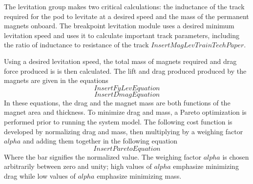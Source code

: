 The levitation group makes two critical calculations: the inductance of the track required for the pod to levitate at a desired speed and the mass of the permanent magnets onboard. The breakpoint levitation module uses a desired minimum levitation speed and uses it to calculate important track parameters, including the ratio of inductance to resistance of the track $Insert MagLevTrain Tech Paper$. 

Using a desired levitation speed, the total mass of magnets required and drag force produced is is then calculated. The lift and drag produced produced by the magnets are given in the equations
\begin{equation}
	\label{eq:fy_lev}
	Insert Fy Lev Equation
\end{equation}
\begin{equation}
	\label{eq:dmag}
	Insert Dmag Equation
\end{equation}
In these equations, the drag and the magnet mass are both functions of the magnet area and thickness. To minimize drag and mass, a Pareto optimization is performed prior to running the system model. The following cost function is developed by normalizing drag and mass, then multiplying by a weighing factor $alpha$ and adding them together in the following equation
\begin{equation}
	\label{eq:pareto}
	Insert Pareto Equation
\end{equation}
Where the bar signifies the normalized value. The weighing factor $alpha$ is chosen arbitrarily between zero and unity; high values of $alpha$ emphasize minimizing drag while low values of $alpha$ emphasize minimizing mass.




